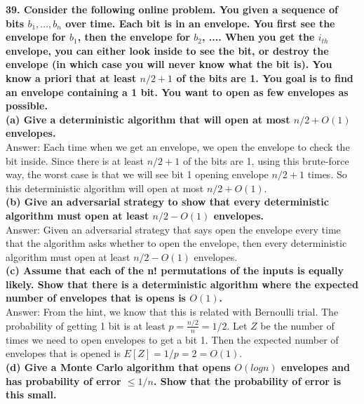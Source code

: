 \documentclass{article}
\begin{document}
\textbf{39. Consider the following online problem. You given a sequence of bits $b_1, ... , b_n$ over time. Each bit is in an envelope. You first see the envelope for $b_1$, then the envelope for $b_2$, .... When you get the $i_{th}$ envelope, you can either look inside to see the bit, or destroy the envelope (in which case you will never know what the bit is). You know a priori that at least $n/2 + 1$ of the bits are 1. You goal is to find an envelope containing a 1 bit. You want to open as few envelopes as possible.} \\ \newline 
\textbf{(a) Give a deterministic algorithm that will open at most $n/2 + O(1)$ envelopes.} \\ \newline
Answer: Each time when we get an envelope, we open the envelope to check the bit inside. Since there is at least $n/2 + 1$ of the bits are 1, using this brute-force way, the worst case is that we will see bit 1 opening envelope $n/2 + 1$ times. So this deterministic algorithm will open at most $n/2 + O(1)$.\\ \newline
\textbf{(b) Give an adversarial strategy to show that every deterministic algorithm must open at least $n/2 - O(1)$ envelopes.} \\ \newline
Answer: Given an adversarial strategy that says open the envelope every time that the algorithm asks whether to open the envelope, then every deterministic algorithm must open at least $n/2 - O(1)$ envelopes. \\ \newline
\textbf{(c) Assume that each of the n! permutations of the inputs is equally likely. Show that there is a deterministic algorithm where the expected number of envelopes that is opens is $O(1)$.} \\ \newline
Answer: From the hint, we know that this is related with Bernoulli trial. The probability of getting 1 bit is at least $p = \frac{n/2}{n}= 1/2$. Let $Z$ be the number of times we need to open envelopes to get a bit 1. Then the expected number of envelopes that is opened is $E[Z] = 1/p = 2 = O(1)$. \\\newline
\textbf{(d) Give a Monte Carlo algorithm that opens $O(logn)$ envelopes and has probability of error $\leq 1/n$. Show that the probability of error is this small.} \\ \newline
\end{document}
